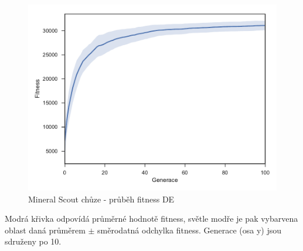 \begin{figure}[t]\centering
	\includegraphics[width=\columnwidth]{../img/MineralMap/MineralScoutWalk}
	\caption{Mineral Scout chůze -  průběh fitness DE}
	\label{obr04:MineralScoutWalk}
\end{figure}
Modrá křivka odpovídá průměrné hodnotě fitness, světle modře je pak vybarvena oblast daná průměrem $\pm$ směrodatná odchylka fitness. Generace (osa y) jsou sdruženy po 10. 
\clearpage

